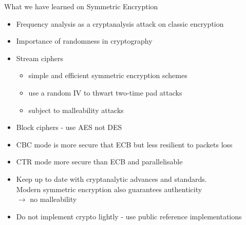 \documentclass[aspectratio=169, lualatex, 10pt,dvipsnames,svgnames]{beamer} %
\begin{document}
\begin{frame}{What we have learned on Symmetric Encryption}
  \vspace{-0.5cm}
  \begin{itemize}
  \item Frequency analysis as a cryptanalysis attack on classic encryption\medskip
  \item Importance of randomness in cryptography\medskip
  \item Stream ciphers
    \begin{itemize}
    \item simple and efficient symmetric encryption schemes 
    \item use a random IV to thwart two-time pad attacks
    \item subject to malleability attacks\medskip
    \end{itemize}
  \item Block ciphers - use AES not DES\medskip
  \item CBC mode is more secure that ECB but less resilient to packets loss\medskip
  \item CTR mode more secure than ECB and parallelisable \medskip
  \item Keep up to date with cryptanalytic advances and standards.\\  
  Modern symmetric encryption also guarantees authenticity \\$\rightarrow$ no malleability
  \medskip
  \item Do not implement crypto lightly - use public reference implementations
 \end{itemize}
\end{frame}
\end{document}
